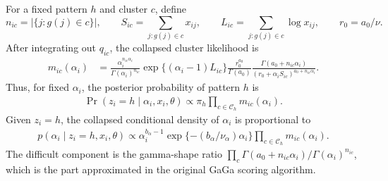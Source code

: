 For a fixed pattern $h$ and cluster $c$, define
\[
n_{ic}=|\{j:g(j)\in c\}|,\qquad
S_{ic}=\sum_{j:g(j)\in c}x_{ij},\qquad
L_{ic}=\sum_{j:g(j)\in c}\log x_{ij},\qquad
r_0=a_0/\nu .
\]
After integrating out $q_{ic}$, the collapsed cluster likelihood is
\begin{align}
m_{ic}(\alpha_i)
&=
\frac{\alpha_i^{n_{ic}\alpha_i}}{\Gamma(\alpha_i)^{n_{ic}}}
\exp\{(\alpha_i-1)L_{ic}\}
\frac{r_0^{a_0}}{\Gamma(a_0)}
\frac{\Gamma(a_0+n_{ic}\alpha_i)}
     {(r_0+\alpha_i S_{ic})^{a_0+n_{ic}\alpha_i}} .
\label{eq:gaga-collapsed}
\end{align}
Thus, for fixed $\alpha_i$, the posterior probability of pattern $h$ is
\begin{align}
\Pr(z_i=h\mid \alpha_i,x_i,\theta)
\propto
\pi_h \prod_{c\in\mathcal{C}_h}m_{ic}(\alpha_i).
\label{eq:gaga-pattern-update}
\end{align}
Given $z_i=h$, the collapsed conditional density of $\alpha_i$ is proportional
to
\begin{align}
p(\alpha_i\mid z_i=h,x_i,\theta)
\propto
\alpha_i^{b_\alpha-1}\exp\{-(b_\alpha/\nu_\alpha)\alpha_i\}
\prod_{c\in\mathcal{C}_h}m_{ic}(\alpha_i).
\label{eq:gaga-alpha-collapsed}
\end{align}
The difficult component is the gamma-shape ratio
$\prod_c \Gamma(a_0+n_{ic}\alpha_i)/\Gamma(\alpha_i)^{n_{ic}}$, which is the
part approximated in the original GaGa scoring algorithm.

